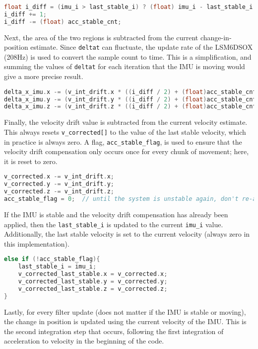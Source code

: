 \documentclass[11pt]{ucthesisCP}
\begin{document}
\begin{lstlisting}[language=C++]
float i_diff = (imu_i > last_stable_i) ? (float) imu_i - last_stable_i : (float) 10000 - last_stable_i + imu_i;
i_diff += 1;
i_diff -= (float) acc_stable_cnt;
\end{lstlisting}

Next, the area of the two regions is subtracted from the current change-in-position estimate. Since \verb|deltat| can fluctuate,  the update rate of the LSM6DSOX (208Hz) is used to convert the sample count to time. This is a simplification, and summing the values of \verb|deltat| for each iteration that the IMU is moving would give a more precise result.

\begin{lstlisting}[language=C++]
delta_x_imu.x -= (v_int_drift.x * ((i_diff / 2) + (float)acc_stable_cnt) / sampleFreq);
delta_x_imu.y -= (v_int_drift.y * ((i_diff / 2) + (float)acc_stable_cnt) / sampleFreq);
delta_x_imu.z -= (v_int_drift.z * ((i_diff / 2) + (float)acc_stable_cnt) / sampleFreq);
\end{lstlisting}

Finally, the velocity drift value is subtracted from the current velocity estimate. This always resets \verb|v_corrected[]| to the value of the last stable velocity, which in practice is always zero. A flag, \verb|acc_stable_flag|, is used to ensure that the velocity drift compensation only occurs once for every chunk of movement; here, it is reset to zero.

\begin{lstlisting}[language=C++]
v_corrected.x -= v_int_drift.x;
v_corrected.y -= v_int_drift.y;
v_corrected.z -= v_int_drift.z;
acc_stable_flag = 0;  // until the system is unstable again, don't re-account for velocity drift
\end{lstlisting}

If the IMU is stable and the velocity drift compensation has already been applied, then the \verb|last_stable_i| is updated to the current \verb|imu_i| value. Additionally, the last stable velocity is set to the current velocity (always zero in this implementation).

\begin{lstlisting}[language=C++]
else if (!acc_stable_flag){
	last_stable_i = imu_i;
	v_corrected_last_stable.x = v_corrected.x;
	v_corrected_last_stable.y = v_corrected.y;
	v_corrected_last_stable.z = v_corrected.z;
}
\end{lstlisting}

Lastly, for every filter update (does not matter if the IMU is stable or moving), the change in position is updated using the current velocity of the IMU. This is the second integration step that occurs, following the first integration of acceleration to velocity in the beginning of the code.
\end{document}
